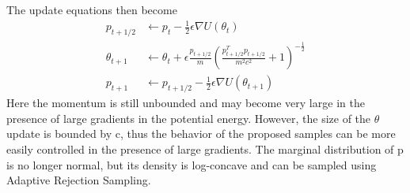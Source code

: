 The update equations then become
\begin{eqnarray}
p_{t+1/2} &\leftarrow p_t -\frac{1}{2}\epsilon\nabla U(\theta_t)\\
\theta_{t+1} &\leftarrow \theta_t + \epsilon \frac{p_{t+1/2}}{m}\left(\frac{p_{t+1/2}^T p_{t+1/2}}{m^2c^2}+1\right)^{-\frac{1}{2}}\\
p_{t+1} &\leftarrow p_{t+1/2} -\frac{1}{2}\epsilon\nabla U(\theta_{t+1})
\end{eqnarray}
Here the momentum is still unbounded and may become very large in the presence of large
gradients in the potential energy. However, the size of the $\theta$ update is bounded by c, thus the behavior of the proposed samples can be more easily controlled in the presence
of large gradients. The marginal distribution of p is no longer normal, but its density is log-concave and can be sampled using Adaptive Rejection Sampling.

